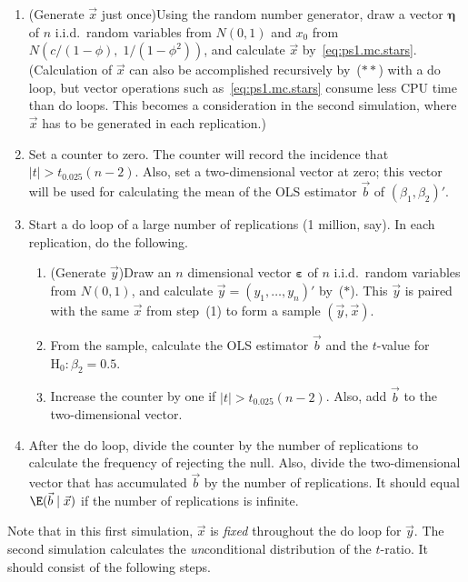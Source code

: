 \begin{problemset}
\begin{enumerate}[label=(\alph*)]
\begin{enumerate}[label=(\arabic*)]
\item (Generate $\vec{x}$ just once)\quad Using the random number generator,
draw a vector $\bm{\eta}$ of $n$ i.i.d.\ random variables from $N(0, 1)$ and
$x_0$ from $N(c/(1 - \phi),\; 1/(1 - \phi^2))$, and calculate $\vec{x}$
by~\eqref{eq:ps1.mc.stars}. (Calculation of $\vec{x}$ can also be
accomplished recursively by~($**$) with a do loop, but vector operations such
as~\eqref{eq:ps1.mc.stars} consume less CPU time than do loops. This becomes
a consideration in the second simulation, where $\vec{x}$ has to be generated
in each replication.)

\item Set a counter to zero. The counter will record the incidence that
$|t| > t_{0.025}(n - 2)$. Also, set a two-dimensional vector at zero; this
vector will be used for calculating the mean of the OLS estimator $\vec{b}$
of $(\beta_1, \beta_2)'$.

\item Start a do loop of a large number of replications (1 million, say).
In each replication, do the following.

\begin{enumerate}[label=(\roman*)]
\item (Generate $\vec{y}$)\quad Draw an $n$ dimensional vector
$\bm{\varepsilon}$ of $n$ i.i.d.\ random variables from $N(0, 1)$, and
calculate $\vec{y} = (y_1, \ldots, y_n)'$ by~($*$). This $\vec{y}$ is
paired with the same $\vec{x}$ from step~(1) to form a sample
$(\vec{y}, \vec{x})$.

\item From the sample, calculate the OLS estimator $\vec{b}$ and the
$t$-value for $\mathrm{H}_0\colon \beta_2 = 0.5$.

\item Increase the counter by one if $|t| > t_{0.025}(n - 2)$. Also, add
$\vec{b}$ to the two-dimensional vector.
\end{enumerate}

\item After the do loop, divide the counter by the number of replications to
calculate the frequency of rejecting the null. Also, divide the
two-dimensional vector that has accumulated $\vec{b}$ by the number of
replications. It should equal $\E(\vec{b} \mid \vec{x})$ if the number of
replications is infinite.
\end{enumerate}

Note that in this first simulation, $\vec{x}$ is \textit{fixed} throughout
the do loop for $\vec{y}$. The second simulation calculates the
\textit{un}conditional distribution of the $t$-ratio. It should consist of
the following steps.


\end{enumerate}
\end{problemset}
